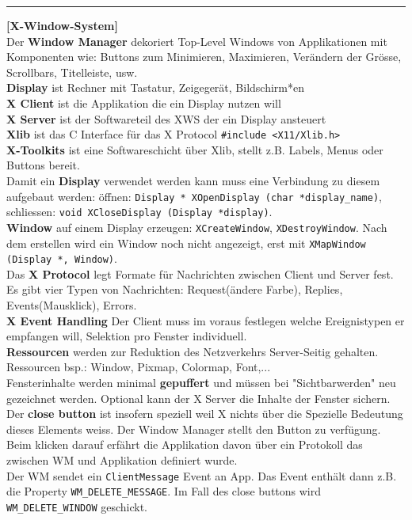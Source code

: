 \documentclass[8pt]{extarticle}
\let\oldtextbf\textbf
\renewcommand{\textbf}{\tiny\oldtextbf}
\begin{document}
\begin{multicols*}{5}
	\vspace{5pt}
	\rule{\linewidth}{0.4pt}
	\textbf{[X-Window-System]}\\
	
	Der \textbf{Window Manager} dekoriert Top-Level Windows von Applikationen mit Komponenten  wie: Buttons zum Minimieren, Maximieren, Verändern der Grösse, Scrollbars, Titelleiste, usw.\\
	
	\textbf{Display} ist Rechner mit Tastatur, Zeigegerät, Bildschirm*en\\
	\textbf{X Client} ist die Applikation die ein Display nutzen will\\
	\textbf{X Server} ist der Softwareteil des XWS der ein Display ansteuert\\
	\textbf{Xlib} ist das C Interface für das X Protocol \texttt{\#include <X11/Xlib.h>}\\
	\textbf{X-Toolkits} ist eine Softwareschicht über Xlib, stellt z.B. Labels, Menus oder Buttons bereit.\\
	
	Damit ein \textbf{Display} verwendet werden kann muss eine Verbindung zu diesem aufgebaut werden: öffnen: \texttt{Display * XOpenDisplay (char *display\_name)}, schliessen: \texttt{void XCloseDisplay (Display *display)}.\\
	\textbf{Window} auf einem Display erzeugen: \texttt{XCreateWindow}, \texttt{XDestroyWindow}. Nach dem erstellen wird ein Window noch nicht angezeigt, erst mit \texttt{XMapWindow (Display *, Window)}.\\
	
	Das \textbf{X Protocol} legt Formate für Nachrichten zwischen Client und Server fest. Es gibt vier Typen von Nachrichten: Request(ändere Farbe), Replies, Events(Mausklick), Errors.\\
	
	\textbf{X Event Handling} Der Client muss im voraus festlegen welche Ereignistypen er empfangen will, Selektion pro Fenster individuell.\\
	
	\textbf{Ressourcen} werden zur Reduktion des Netzverkehrs Server-Seitig gehalten. Ressourcen bsp.: Window, Pixmap, Colormap, Font,...\\
	Fensterinhalte werden minimal \textbf{gepuffert} und müssen bei "Sichtbarwerden" neu gezeichnet werden. Optional kann der X Server die Inhalte der Fenster sichern.\\
	
	Der \textbf{close button} ist insofern speziell weil X nichts über die Spezielle Bedeutung dieses Elements weiss. Der Window Manager stellt den Button zu verfügung. Beim klicken darauf erfährt die Applikation davon über ein Protokoll das zwischen WM und Applikation definiert wurde.\\
	Der WM sendet ein \texttt{ClientMessage} Event an App. Das Event enthält dann z.B. die Property \texttt{WM\_DELETE\_MESSAGE}. Im Fall des close buttons wird \texttt{WM\_DELETE\_WINDOW} geschickt.
	
\end{multicols*}
\end{document}
